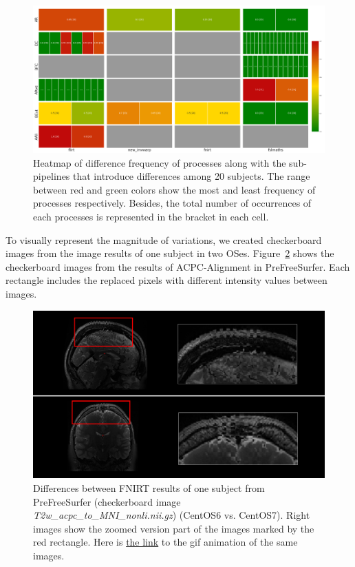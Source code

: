 \documentclass[a4paper,num-refs]{oup-contemporary}
\begin{document}
\begin{figure}
\centering
  \includegraphics[width=\columnwidth]{images/pfs_heatmap.png}
  \caption{Heatmap of difference frequency of processes along with the sub-pipelines that introduce 
           differences among 20 subjects. The range between red and green colors show the most and 
           least frequency of processes respectively. Besides, the total number 
           of occurrences of each processes is represented in the bracket in each cell.}
  \label{fig:pfs_freq}
\end{figure}

To visually represent the magnitude of variations, we created checkerboard 
images from the image results of one subject in two OSes. Figure~\ref{fig:fnirt_result} 
shows the checkerboard images from the results of ACPC-Alignment in PreFreeSurfer. 
Each rectangle includes the replaced pixels with different intensity values between images.


\begin{figure}
  \centering
    \includegraphics[width=\columnwidth]{images/segmentation.png} 
    \caption{Differences between FNIRT results of one subject from PreFreeSurfer 
    (checkerboard image \emph{T2w\_acpc\_to\_MNI\_nonli.nii.gz}) (CentOS6 vs. 
    CentOS7). Right images show the zoomed version part of the images marked 
    by the red rectangle.
    Here is 
    \href{https://raw.githubusercontent.com/ali4006/HCP-reproducibility-paper/master/images/brain_classification.gif}{the link}
    to the gif animation of the same images.
} 
    \label{fig:fnirt_result}
\end{figure}
\end{document}
